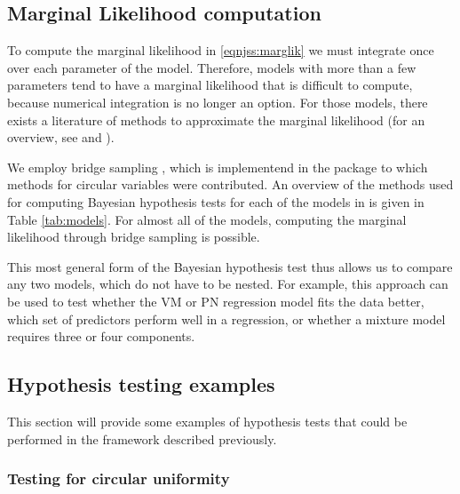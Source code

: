 \hypertarget{marginal-likelihood-computation}{%
\subsection{Marginal Likelihood
computation}\label{marginal-likelihood-computation}}

\label{sec:bridge}

To compute the marginal likelihood in \eqref{eqnjss:marglik} we must
integrate once over each parameter of the model. Therefore, models with
more than a few parameters tend to have a marginal likelihood that is
difficult to compute, because numerical integration is no longer an
option. For those models, there exists a literature of methods to
approximate the marginal likelihood (for an overview, see
\citet{friel2012estimating} and \citet{ardia2012comparative}).

We employ bridge sampling
\citep{meng1996simulating, gronau2017tutorial}, which is implementend in
the package  \citep{gronau2017bridgesampling} to
which methods for circular variables were contributed. An overview of
the methods used for computing Bayesian hypothesis tests for each of the
models in  is given in Table \ref{tab:models}. For almost
all of the models, computing the marginal likelihood through bridge
sampling is possible.

This most general form of the Bayesian hypothesis test thus allows us to
compare any two models, which do not have to be nested. For example,
this approach can be used to test whether the VM or PN regression model
fits the data better, which set of predictors perform well in a
regression, or whether a mixture model requires three or four
components.

\hypertarget{hypothesis-testing-examples}{%
\subsection{Hypothesis testing
examples}\label{hypothesis-testing-examples}}

This section will provide some examples of hypothesis tests that could
be performed in the framework described previously.

\hypertarget{testing-for-circular-uniformity}{%
\subsubsection{Testing for circular
uniformity}\label{testing-for-circular-uniformity}}

